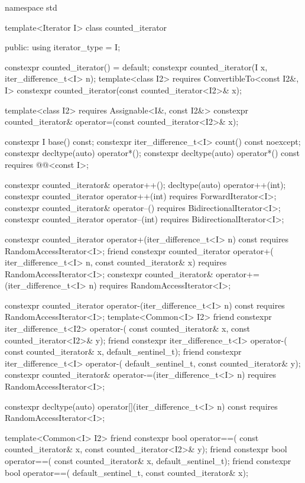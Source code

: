 %
\begin{codeblock}
namespace std {
  template<Iterator I>
  class counted_iterator {
  public:
    using iterator_type = I;

    constexpr counted_iterator() = default;
    constexpr counted_iterator(I x, iter_difference_t<I> n);
    template<class I2>
      requires ConvertibleTo<const I2&, I>
        constexpr counted_iterator(const counted_iterator<I2>& x);

    template<class I2>
      requires Assignable<I&, const I2&>
        constexpr counted_iterator& operator=(const counted_iterator<I2>& x);

    constexpr I base() const;
    constexpr iter_difference_t<I> count() const noexcept;
    constexpr decltype(auto) operator*();
    constexpr decltype(auto) operator*() const
      requires @@<const I>;

    constexpr counted_iterator& operator++();
    decltype(auto) operator++(int);
    constexpr counted_iterator operator++(int)
      requires ForwardIterator<I>;
    constexpr counted_iterator& operator--()
      requires BidirectionalIterator<I>;
    constexpr counted_iterator operator--(int)
      requires BidirectionalIterator<I>;

    constexpr counted_iterator operator+(iter_difference_t<I> n) const
      requires RandomAccessIterator<I>;
    friend constexpr counted_iterator operator+(
      iter_difference_t<I> n, const counted_iterator& x)
        requires RandomAccessIterator<I>;
    constexpr counted_iterator& operator+=(iter_difference_t<I> n)
      requires RandomAccessIterator<I>;

    constexpr counted_iterator operator-(iter_difference_t<I> n) const
      requires RandomAccessIterator<I>;
    template<Common<I> I2>
      friend constexpr iter_difference_t<I2> operator-(
        const counted_iterator& x, const counted_iterator<I2>& y);
    friend constexpr iter_difference_t<I> operator-(
      const counted_iterator& x, default_sentinel_t);
    friend constexpr iter_difference_t<I> operator-(
      default_sentinel_t, const counted_iterator& y);
    constexpr counted_iterator& operator-=(iter_difference_t<I> n)
      requires RandomAccessIterator<I>;

    constexpr decltype(auto) operator[](iter_difference_t<I> n) const
      requires RandomAccessIterator<I>;

    template<Common<I> I2>
      friend constexpr bool operator==(
        const counted_iterator& x, const counted_iterator<I2>& y);
    friend constexpr bool operator==(
      const counted_iterator& x, default_sentinel_t);
    friend constexpr bool operator==(
      default_sentinel_t, const counted_iterator& x);

}}
\end{codeblock}
